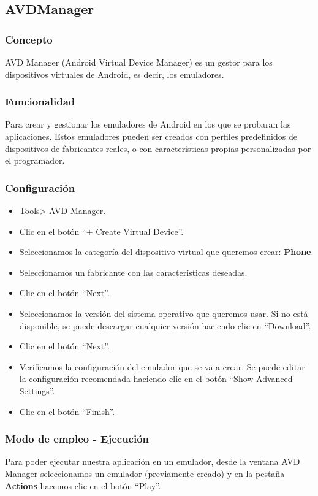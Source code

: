 \subsection{AVDManager}
\subsubsection{Concepto}
	AVD Manager (Android Virtual Device Manager) es un gestor para los dispositivos virtuales de Android, es decir, los emuladores. 
\subsubsection{Funcionalidad}
Para crear y gestionar los emuladores de Android en los que se probaran las aplicaciones. Estos emuladores pueden ser creados con perfiles predefinidos de dispositivos de fabricantes reales, o con características propias personalizadas por el programador.
\subsubsection{Configuración}
\begin{itemize}
	\item Tools> AVD Manager.
	\item Clic en el botón ``+ Create Virtual Device''.
	\item Seleccionamos la categoría del dispositivo virtual que queremos crear: \textbf{Phone}.
	\item Seleccionamos un fabricante con las características deseadas.
	\item Clic en el botón ``Next''.
	\item Seleccionamos la versión del sistema operativo que queremos usar. Si no está disponible, se puede descargar cualquier versión haciendo clic en ``Download''.
	\item Clic en el botón ``Next''.
	\item Verificamos la configuración del emulador que se va a crear. Se puede editar la configuración recomendada haciendo clic en el botón ``Show Advanced Settings''.
	\item Clic en el botón ``Finish''.
\end{itemize}
\subsubsection{Modo de empleo - Ejecución}
Para poder ejecutar nuestra aplicación en un emulador, desde la ventana AVD Manager seleccionamos un emulador (previamente creado) y en la pestaña \textbf{Actions} hacemos clic en el botón ``Play''.

